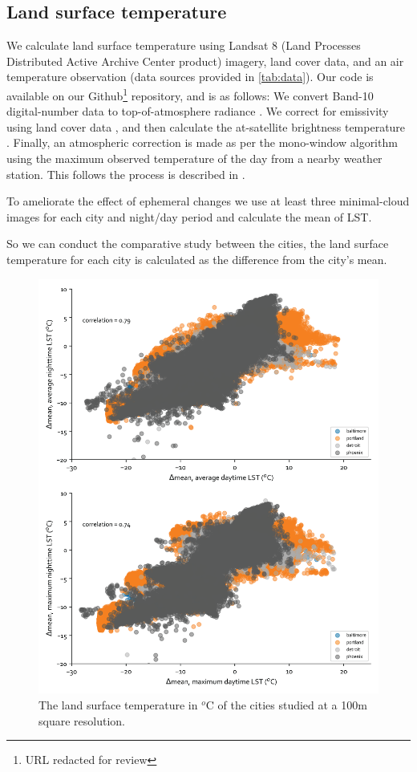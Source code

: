 \documentclass[review]{elsarticle}
\begin{document}
\subsection{Land surface temperature}
We calculate land surface temperature using Landsat 8 (Land Processes Distributed Active Archive Center product) imagery, land cover data, and an air temperature observation (data sources provided in \ref{tab:data}). 
Our code is available on our Github\footnote{URL redacted for review} repository, and is as follows:
We convert Band-10 digital-number data to top-of-atmosphere radiance \cite{Jimenez-Munoz2003-wc}. 
We correct for emissivity using land cover data \cite{Alipour2003-ym}, and then calculate the at-satellite brightness temperature \cite{Jimenez-Munoz2003-wc}. 
Finally, an atmospheric correction is made as per the mono-window algorithm \cite{Qin2001-jn} using the maximum observed temperature of the day from a nearby weather station. 
This follows the process is described in \cite{Scott2016-lc}. 

To ameliorate the effect of ephemeral changes \cite{Zhou2018-iy} we use at least three minimal-cloud images for each city and night/day period and calculate the mean of LST.

So we can conduct the comparative study between the cities, the land surface temperature for each city is calculated as the difference from the city's mean. 

\begin{figure}
    \begin{center}
    \includegraphics[width=\linewidth]{fig/report/scatter_100.png}
    \caption{The land surface temperature in $^o$C of the cities studied at a 100m square resolution.}
    \label{fig:scatter_lst}
    \end{center}
\end{figure}
\end{document}
